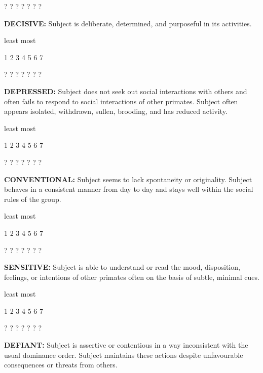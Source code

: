 \documentclass{article} %
\begin{document}
  ?    ?    ?    ?    ?    ?    ?   

\noindent \textbf{ }

\noindent \textbf{DECISIVE:} Subject is deliberate, determined, and purposeful in its activities. 

\noindent  

\noindent least                            most

  1    2    3    4    5    6    7   

  ?    ?    ?    ?    ?    ?    ?   

\noindent  

\noindent \textbf{DEPRESSED:} Subject does not seek out social interactions with others and often fails to respond to social interactions of other primates. Subject often appears isolated, withdrawn, sullen, brooding, and has reduced activity. 

\noindent  

\noindent least                            most

  1    2    3    4    5    6    7   

  ?    ?    ?    ?    ?    ?    ?   

\noindent \textbf{ }

\noindent \textbf{CONVENTIONAL:} Subject seems to lack spontaneity or originality. Subject behaves in a consistent manner from day to day and stays well within the social rules of the group. 

\noindent  

\noindent least                            most

  1    2    3    4    5    6    7   

  ?    ?    ?    ?    ?    ?    ?   

\noindent \textbf{ }

\noindent \textbf{SENSITIVE:} Subject is able to understand or read the mood, disposition, feelings, or intentions of other primates often on the basis of subtle, minimal cues. 

\noindent  

\noindent least                            most

  1    2    3    4    5    6    7   

  ?    ?    ?    ?    ?    ?    ?   

\noindent \textbf{ }

\noindent \textbf{DEFIANT:} Subject is assertive or contentious in a way inconsistent with the usual dominance order. Subject maintains these actions despite unfavourable consequences or threats from others. 
\end{document}
